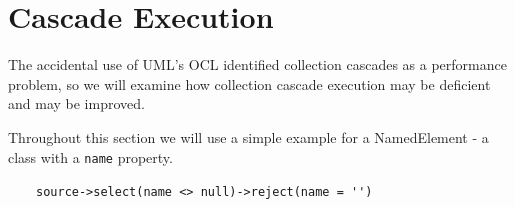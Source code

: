 \documentclass[
]{ceurart}
\begin{document}





\section{Cascade Execution}\label{Cascade Execution}

The accidental use of UML's OCL identified collection cascades as a performance problem, so we will examine how collection cascade execution may be deficient and may be improved.

Throughout this section we will use a simple example for a NamedElement - a class with a \verb!name! property.

\begin{description}[itemsep=-0.2cm]\small
\item ~~~~\verb!source->select(name <> null)->reject(name = '')!
\end{description}
\end{document}
